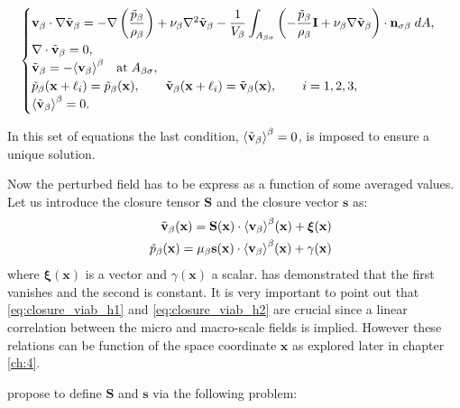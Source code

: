 \begin{eqnarray}
\begin{cases}
\textbf{v}_{\beta} \cdot \nabla \tilde{\textbf{v}}_{\beta} = -\nabla \left(\dfrac{\tilde{p}_{\beta}}{\rho_{\beta}}\right) + \nu_{\beta} \nabla^2 \tilde{\textbf{v}}_{\beta} - \dfrac{1}{V_\beta} \displaystyle \int_{A_{\beta \sigma}} \left(-\dfrac{\tilde{p}_{\beta}}{\rho_{\beta}} \mathbf{I}  + \nu_{\beta} \nabla \tilde{\textbf{v}}_{\beta} \right) \cdot \mathbf{n}_{\sigma \beta} \;dA,  \\
\nabla \cdot \tilde{\textbf{v}}_{\beta} = 0, \\
\tilde{\textbf{v}}_{\beta} = -{\left< \textbf{v}_{\beta} \right>}^{\beta} \quad \textrm{at} \; A_{\beta \sigma}, \\
\tilde{p}_{\beta}(\mathbf{x} +\ell_i) = \tilde{p}_{\beta}(\mathbf{x}), \qquad \tilde{\textbf{v}}_{\beta}(\mathbf{x} +\ell_i) = \tilde{\textbf{v}}_{\beta}(\mathbf{x}), \qquad i=1,2,3 ,\\
{\left< \tilde{\textbf{v}}_{\beta} \right>}^{\beta} = 0.
\end{cases}
\label{eq:vans_mom_2}
\end{eqnarray}

In this set of equations the last condition, ${\left< \tilde{\textbf{v}}_{\beta} \right>}^{\beta} = 0$, is imposed to ensure a unique solution.

Now the perturbed field has to be express as a function of some averaged values. Let us introduce the closure tensor $\mathbf{S}$ and  the closure vector $\mathbf{s}$ as:
\begin{eqnarray}
&& \tilde{\textbf{v}}_{\beta}(\mathbf{x}) = \mathbf{S}(\mathbf{x})  \cdot {\left< \textbf{v}_{\beta}\right>}^{\beta}(\mathbf{x})  +\boldsymbol{\xi}(\mathbf{x})  	\label{eq:closure_viab_h1} \\
&& \tilde{p}_{\beta}(\mathbf{x})  = \mu_{\beta} \mathbf{s}(\mathbf{x})  \cdot {\left< \textbf{v}_{\beta}\right>}^{\beta}(\mathbf{x})  + \gamma(\mathbf{x}) \label{eq:closure_viab_h2}
\end{eqnarray}
where $\boldsymbol{\xi}(\mathbf{x})$ is a vector and $\gamma(\mathbf{x})$ a scalar. \citet{whitaker1996forchheimer} has demonstrated that the first vanishes and the second is constant.
It is very important to point out that \eqref{eq:closure_viab_h1} and \eqref{eq:closure_viab_h2} are crucial since a linear correlation between the micro and macro-scale fields is implied.
However these relations can be function of the space coordinate $\mathbf{x}$ as explored later in chapter \ref{ch:4}.

\citet{whitaker1996forchheimer} propose to define $\mathbf{S}$ and $\mathbf{s}$ via the following problem:

